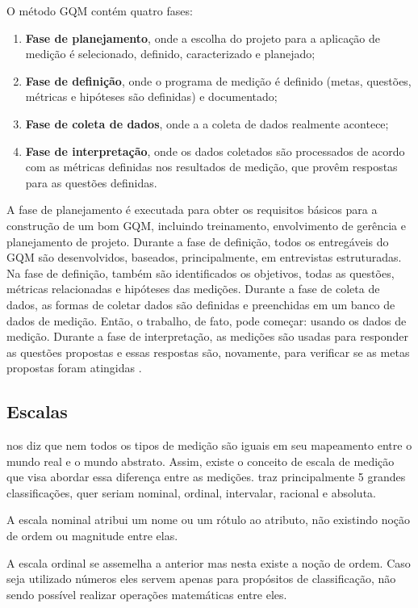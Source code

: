  O método GQM contém quatro fases:
\begin{enumerate}
  \item   \textbf{Fase de planejamento}, onde a escolha do projeto para a aplicação de
  medição é selecionado, definido, caracterizado e planejado;
  \item  \textbf{Fase de definição}, onde o programa de medição é definido (metas, questões,
  métricas e hipóteses são definidas) e documentado;
  \item  \textbf{Fase de coleta de dados}, onde a a coleta de dados realmente acontece;
  \item  \textbf{Fase de interpretação}, onde os dados coletados são processados de
  acordo com as métricas definidas nos resultados de medição, que provêm
  respostas para as questões definidas.
\end{enumerate}

A fase de planejamento é executada para obter os requisitos básicos para a
construção de um bom GQM, incluindo treinamento, envolvimento de gerência e
planejamento de projeto. Durante a fase de definição, todos os entregáveis do
GQM são desenvolvidos, baseados, principalmente, em entrevistas estruturadas.
Na fase de definição, também são identificados os objetivos, todas as questões,
métricas relacionadas e hipóteses das medições. Durante a fase de coleta de
dados, as formas de coletar dados são definidas e preenchidas em um banco de
dados de medição. Então, o trabalho, de
fato, pode começar: usando os dados de medição. Durante a fase de interpretação,
as medições são usadas para responder as questões propostas e essas respostas são,
novamente, para verificar se as metas propostas foram atingidas \cite{egon}.


\subsection{Escalas}
\cite{fenton} nos diz que nem todos os tipos de medição são iguais em seu mapeamento
entre o mundo real e o mundo abstrato. Assim, existe o conceito de escala de
medição que visa abordar essa diferença entre as medições. \cite{fenton} traz principalmente
5 grandes classificações, quer seriam nominal, ordinal, intervalar, racional e
absoluta.

A escala nominal atribui um nome ou um rótulo ao atributo, não existindo noção
de ordem ou magnitude entre elas.

A escala ordinal se assemelha a anterior mas nesta existe a noção de ordem. Caso
seja utilizado números eles servem apenas para propósitos de classificação, não
sendo possível realizar operações matemáticas entre eles.

